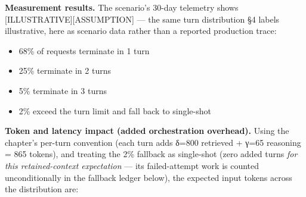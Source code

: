 \textbf{Measurement results.} The scenario's 30-day telemetry shows
\mbox{{[}ILLUSTRATIVE{]}}\hspace{0pt}\mbox{{[}ASSUMPTION{]}} --- the same turn distribution §4
labels illustrative, here as scenario data rather than a reported
production trace:

\begin{itemize}
\tightlist
\item
  68\% of requests terminate in 1 turn
\item
  25\% terminate in 2 turns
\item
  5\% terminate in 3 turns
\item
  2\% exceed the turn limit and fall back to single-shot
\end{itemize}

\textbf{Token and latency impact (added orchestration overhead).} Using
the chapter's per-turn convention (each turn adds δ=800 retrieved + γ=65
reasoning = 865 tokens), and treating the 2\% fallback as single-shot
(zero added turns \emph{for this retained-context expectation} --- its
failed-attempt work is counted unconditionally in the fallback ledger
below), the expected input tokens across the distribution are:


